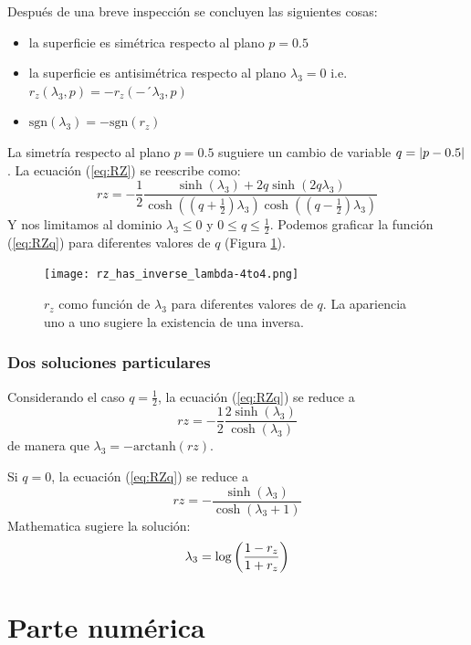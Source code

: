 \documentclass[onecolumn,11pt]{article}
\begin{document}
Después de una breve inspección se concluyen las siguientes cosas:
\begin{itemize}
\item la superficie es simétrica respecto al plano $p=0.5$
\item la superficie es antisimétrica  respecto al plano $\lambda_{3}=0$ i.e. $r_{z
}(\lambda_{3},p)=-r_{z
}(-´\lambda_{3},p)$
\item $\text{sgn}(\lambda_{3})=-\text{sgn}(r_{z})$
\end{itemize}

La simetría respecto al plano $p=0.5$ suguiere un cambio de variable $q=\abs{p-0.5}$. La ecuación (\ref{eq:RZ}) se reescribe como:
\begin{equation}\label{eq:RZq}
rz=-\frac{1}{2}\frac{\sinh(\lambda_{3})+2q\sinh(2q\lambda_{3})}{\cosh((q+\frac{1}{2})\lambda_{3})\cosh((q-\frac{1}{2})\lambda_{3})}
\end{equation}
Y nos limitamos al dominio $\lambda_{3}\leq0$ y $0\leq q\leq\frac{1}{2}$. Podemos graficar la función (\ref{eq:RZq}) para diferentes valores de $q$ (Figura \ref{fig:rzinv}).
\begin{figure}[h!]
\centering
\texttt{[image: rz\_has\_inverse\_lambda-4to4.png]}
\caption{$r_{z}$ como función de $\lambda_{3}$ para diferentes valores de $q$. La apariencia uno a uno sugiere la existencia de una inversa.}
\label{fig:rzinv}
\end{figure}
\subsubsection{Dos soluciones particulares}

Considerando el caso $q=\frac{1}{2}$, la ecuación (\ref{eq:RZq}) se reduce a 
\begin{equation}
rz=-\frac{1}{2}\frac{2\sinh(\lambda_{3})}{\cosh(\lambda_{3})}
\end{equation}
de manera que $\lambda_{3}=-\text{arctanh}(rz)$.

Si $q=0$, la ecuación (\ref{eq:RZq}) se reduce a
\begin{equation}
rz=-\frac{\sinh(\lambda_{3})}{\cosh(\lambda_{3}+1)}
\end{equation}
Mathematica sugiere la solución:
\begin{equation}
\lambda_{3}=\log\qty(\frac{1-r_{z}}{1+r_{z}})
\end{equation}


\newpage


\section{Parte numérica}
\end{document}
